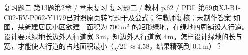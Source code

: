 \par\noindent\begin{minipage}{\linewidth}
\begin{bankitem}{复习题二 第13题}{第2章 / 章末复习 复习题二 / 教材 p.62 / PDF 第69页}{XJ-B1-C02-RV-P062-Y1179}{已对照原页转写题干及公式；待教师复核；未制作答案}
如图，某新建居民小区欲建一面积为 $700\,\mathrm{m^2}$ 的矩形绿地，在绿地四周铺设人行道。设计要求绿地长边外人行道宽 $3\,\mathrm m$，短边外人行道宽 $4\,\mathrm m$。怎样设计绿地的长与宽，才能使人行道的占地面积最小（$\sqrt{21}\approx4.58$，结果精确到 $0.1\,\mathrm m$）？
\end{bankitem}
\end{minipage}\par\medskip
